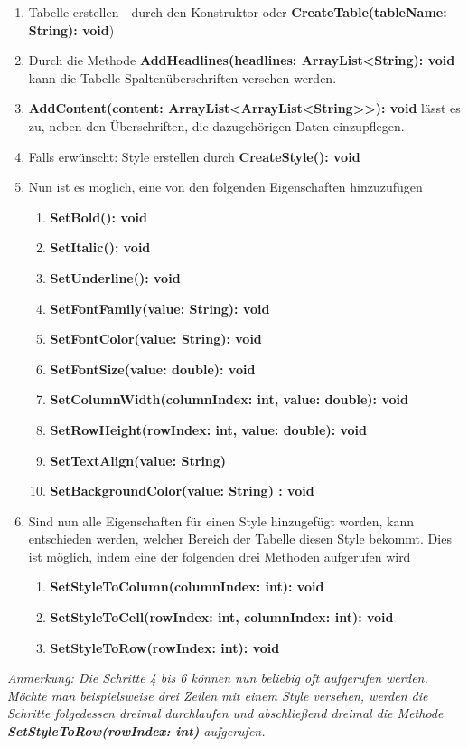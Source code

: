 \begin{enumerate} 
\item Tabelle erstellen - durch den Konstruktor oder \textbf{CreateTable(tableName: String): void})
\item Durch die Methode \textbf{AddHeadlines(headlines: ArrayList<String): void} kann die Tabelle Spaltenüberschriften versehen werden.
\item \textbf{AddContent(content: ArrayList<ArrayList<String{>}{>}): void} lässt es zu, neben den Überschriften, die dazugehörigen Daten einzupflegen.
\item Falls erwünscht: Style erstellen durch \textbf{CreateStyle(): void}
\item Nun ist es möglich, eine von den folgenden Eigenschaften hinzuzufügen
\begin{enumerate}
\item \textbf{SetBold(): void}
\item \textbf{SetItalic(): void}
\item \textbf{SetUnderline(): void}
\item \textbf{SetFontFamily(value: String): void}
\item \textbf{SetFontColor(value: String): void}
\item \textbf{SetFontSize(value: double): void}
\item \textbf{SetColumnWidth(columnIndex: int, value: double): void}
\item \textbf{SetRowHeight(rowIndex: int, value: double): void}
\item \textbf{SetTextAlign(value: String)}
\item \textbf{SetBackgroundColor(value: String) : void}
\end{enumerate}
\item Sind nun alle Eigenschaften für einen Style hinzugefügt worden, kann entschieden werden, welcher Bereich der Tabelle diesen Style bekommt. Dies ist möglich, indem eine der folgenden drei Methoden aufgerufen wird
\begin{enumerate}
\item \textbf{SetStyleToColumn(columnIndex: int): void}
\item \textbf{SetStyleToCell(rowIndex: int, columnIndex: int): void}
\item \textbf{SetStyleToRow(rowIndex: int): void}
\end{enumerate}
\end{enumerate}
\textit{Anmerkung: Die Schritte 4 bis 6 können nun beliebig oft aufgerufen werden. Möchte man beispielsweise drei Zeilen mit einem Style versehen, werden die Schritte folgedessen dreimal durchlaufen und abschließend dreimal die Methode \textbf{SetStyleToRow(rowIndex: int)} aufgerufen.}
